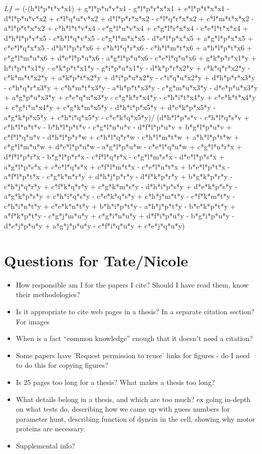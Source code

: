 \documentclass[10pt]{article} %
\begin{document}
$\dot{Lf}$ =
{\tiny
    (-(h*l*p*t*v*x1) + g*l*p*u*v*x1 - g*l*p*r*x*x1 + e*l*p*t*x*x1 -
     d*l*p*u*v*x2 + c*l*q*u*v*x2 + d*l*p*r*x*x2 - c*l*q*r*x*x2 +
     c*l*m*t*x*x2 - a*l*p*t*x*x2 + c*h*l*t*v*x4 - c*g*l*u*v*x4 +
     c*g*l*r*x*x4 - c*e*l*t*x*x4 + d*h*l*p*v*x5 - c*h*l*q*v*x5 -
     c*g*l*m*x*x5 - d*e*l*p*x*x5 + a*g*l*p*x*x5 + c*e*l*q*x*x5 -
     d*h*l*p*r*x6 + c*h*l*q*r*x6 - c*h*l*m*t*x6 + a*h*l*p*t*x6 +
     c*g*l*m*u*x6 + d*e*l*p*u*x6 - a*g*l*p*u*x6 - c*e*l*q*u*x6 +
     g*k*p*r*x1*y + h*i*p*t*x1*y - e*k*p*t*x1*y - g*i*p*u*x1*y -
     d*k*p*r*x2*y + c*k*q*r*x2*y - c*k*m*t*x2*y + a*k*p*t*x2*y +
     d*i*p*u*x2*y - c*i*q*u*x2*y + d*h*p*r*x3*y - c*h*q*r*x3*y +
     c*h*m*t*x3*y - a*h*p*t*x3*y - c*g*m*u*x3*y - d*e*p*u*x3*y +
     a*g*p*u*x3*y + c*e*q*u*x3*y - c*g*k*r*x4*y - c*h*i*t*x4*y +
     c*e*k*t*x4*y + c*g*i*u*x4*y + c*g*k*m*x5*y - d*h*i*p*x5*y +
     d*e*k*p*x5*y - a*g*k*p*x5*y + c*h*i*q*x5*y - c*e*k*q*x5*y)/
     (d*h*l*p*s*v - c*h*l*q*s*v + c*h*l*n*t*v - b*h*l*p*t*v -
     c*g*l*n*u*v - d*f*l*p*u*v + b*g*l*p*u*v + c*f*l*q*u*v -
     d*h*l*p*r*w + c*h*l*q*r*w - c*h*l*m*t*w + a*h*l*p*t*w +
     c*g*l*m*u*w + d*e*l*p*u*w - a*g*l*p*u*w - c*e*l*q*u*w +
     c*g*l*n*r*x + d*f*l*p*r*x - b*g*l*p*r*x - c*f*l*q*r*x -
     c*g*l*m*s*x - d*e*l*p*s*x + a*g*l*p*s*x + c*e*l*q*s*x +
     c*f*l*m*t*x - c*e*l*n*t*x + b*e*l*p*t*x - a*f*l*p*t*x -
     c*g*k*n*r*y + d*h*j*p*r*y - d*f*k*p*r*y + b*g*k*p*r*y -
     c*h*j*q*r*y + c*f*k*q*r*y + c*g*k*m*s*y - d*h*i*p*s*y +
     d*e*k*p*s*y - a*g*k*p*s*y + c*h*i*q*s*y - c*e*k*q*s*y +
     c*h*j*m*t*y - c*f*k*m*t*y - c*h*i*n*t*y + c*e*k*n*t*y +
     b*h*i*p*t*y - a*h*j*p*t*y - b*e*k*p*t*y + a*f*k*p*t*y -
     c*g*j*m*u*y + c*g*i*n*u*y + d*f*i*p*u*y - b*g*i*p*u*y -
     d*e*j*p*u*y + a*g*j*p*u*y - c*f*i*q*u*y + c*e*j*q*u*y)
}


\section{Questions for Tate/Nicole}
\begin{itemize}
\item How responsible am I for the papers I cite? Should I have read them, know their methodologies?
\item Is it appropriate to cite web pages in a thesis? In a separate citation section? For images
\item When is a fact ``common knowledge'' enough that it doesn't need a citation?
\item Some papers have 'Request permission to reuse' links for figures - do I need to do this for copying figures?
\item Is 25 pages too long for a thesis? What makes a thesis too long?
\item What details belong in a thesis, and which are too much? ex going in-depth on what tests do, describing how we came up with guess numbers for parameter hunt, describing function of dynein in the cell, showing why motor proteins are necessary.
\item Supplemental info?
\end{itemize}
\end{document}
